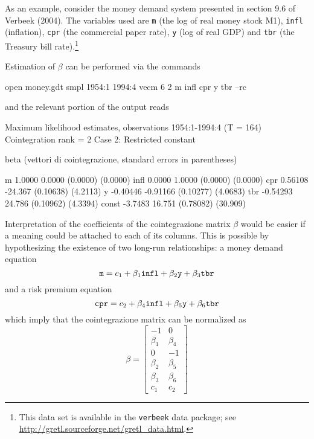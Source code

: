 As an example, consider the money demand system presented in section
9.6 of Verbeek (2004).  The variables used are \texttt{m} (the log of
real money stock M1), \texttt{infl} (inflation), \texttt{cpr} (the
commercial paper rate), \texttt{y} (log of real GDP) and \texttt{tbr}
(the Treasury bill rate).\footnote{This data set is available in the
  \texttt{verbeek} data package; see
  \url{http://gretl.sourceforge.net/gretl_data.html}.}

Estimation of $\beta$ can be performed via the commands
\begin{code}
  open money.gdt 
  smpl 1954:1 1994:4 
  vecm 6 2 m infl cpr y tbr --rc
\end{code}
and the relevant portion of the output reads
\begin{code}
Maximum likelihood estimates, observations 1954:1-1994:4 (T = 164)
Cointegration rank = 2
Case 2: Restricted constant

beta (vettori di cointegrazione, standard errors in parentheses)

m           1.0000       0.0000 
           (0.0000)     (0.0000) 
infl        0.0000       1.0000 
           (0.0000)     (0.0000) 
cpr        0.56108      -24.367 
          (0.10638)     (4.2113) 
y         -0.40446     -0.91166 
          (0.10277)     (4.0683) 
tbr       -0.54293       24.786 
          (0.10962)     (4.3394) 
const      -3.7483       16.751 
          (0.78082)     (30.909) 
\end{code}
Interpretation of the coefficients of the cointegrazione matrix $\beta$
would be easier if a meaning could be attached to each of its
columns. This is possible by hypothesizing the existence of two
long-run relationships: a money demand equation
\begin{equation}
  \label{eq:verbeek-mondem}
  \mbox{\tt m} = c_1 + \beta_1 \mbox{\tt infl} + \beta_2 \mbox{\tt
    y} + \beta_3 \mbox{\tt tbr}
\end{equation}
and a risk premium equation
\begin{equation}
  \label{eq:verbeek-premium}
 \mbox{\tt cpr} = c_2 + \beta_4 \mbox{\tt infl} +
   \beta_5 \mbox{\tt y} + \beta_6 \mbox{\tt tbr}
\end{equation}
which imply that the cointegrazione matrix can be normalized as
\[
  \beta = \left[
    \begin{array}{rr}
      -1 & 0 \\ \beta_1 & \beta_4 \\ 0 & -1 \\ \beta_2 & \beta_5
      \\ \beta_3 & \beta_6 \\ c_1 & c_2
    \end{array}
    \right]
\]


